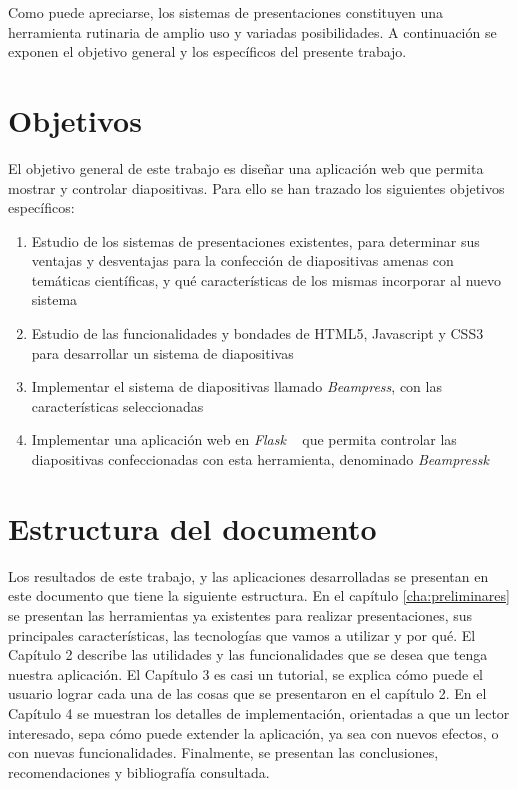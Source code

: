 \begin{introduction}
	Como puede apreciarse, los sistemas de presentaciones constituyen una herramienta rutinaria de amplio uso y variadas posibilidades. A continuación se exponen el objetivo general y los específicos del presente trabajo.


	\section{Objetivos} %
	\label{sec:objetivos}

		El objetivo general de este trabajo es diseñar una aplicación web que permita mostrar y controlar diapositivas. Para ello se han trazado los siguientes objetivos específicos:

		\begin{enumerate}
			\item Estudio de los sistemas de presentaciones existentes, para determinar sus ventajas y desventajas para la confección de diapositivas amenas con temáticas científicas, y qué características de los mismas incorporar al nuevo sistema
			\item Estudio de las funcionalidades y bondades de HTML5, Javascript y CSS3 para desarrollar un sistema de diapositivas
			\item Implementar el sistema de diapositivas llamado \textit{Beampress}, con las características seleccionadas
			\item Implementar una aplicación web en \textit{Flask} ~\cite{flask} que permita controlar las diapositivas confeccionadas con esta herramienta, denominado \textit{Beampressk}
		\end{enumerate}

	\section*{Estructura del documento} %
	\label{sec:estructura_del_documento}
	
		Los resultados de este trabajo, y las aplicaciones desarrolladas se presentan en este documento que tiene la siguiente estructura. En el capítulo \ref{cha:preliminares} se presentan las herramientas ya existentes para realizar presentaciones, sus principales características, las tecnologías que vamos a utilizar y por qué. El Capítulo 2 describe las utilidades y las funcionalidades que se desea que tenga nuestra aplicación. El Capítulo 3 es casi un tutorial, se explica cómo puede el usuario lograr cada una de las cosas que se presentaron en el capítulo 2. En el Capítulo 4 se muestran los detalles de implementación, orientadas a que un lector interesado, sepa cómo puede extender la aplicación, ya sea con nuevos efectos, o con nuevas funcionalidades. Finalmente, se presentan las conclusiones, recomendaciones y bibliografía consultada.





\end{introduction}




